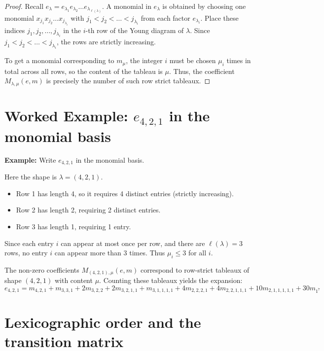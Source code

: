 \documentclass[12pt]{memoir}
\begin{document}
\begin{proof}
Recall $e_\lambda = e_{\lambda_1} e_{\lambda_2} \dots e_{\lambda_{\ell(\lambda)}}$. A monomial in $e_\lambda$ is obtained by choosing one monomial $x_{j_1} x_{j_2} \dots x_{j_{\lambda_i}}$ with $j_1 < j_2 < \dots < j_{\lambda_i}$ from each factor $e_{\lambda_i}$. Place these indices $j_1, j_2, \dots, j_{\lambda_i}$ in the $i$-th row of the Young diagram of $\lambda$. Since $j_1 < j_2 < \dots < j_{\lambda_i}$, the rows are strictly increasing.

To get a monomial corresponding to $m_\mu$, the integer $i$ must be chosen $\mu_i$ times in total across all rows, so the content of the tableau is $\mu$. Thus, the coefficient $M_{\lambda,\mu}(e,m)$ is precisely the number of such row strict tableaux.
\end{proof}

\newpage

\section{Worked Example: \texorpdfstring{$e_{4,2,1}$}{e\_\{4,2,1\}} in the monomial basis}

\textbf{Example:} Write $e_{4,2,1}$ in the monomial basis.

Here the shape is $\lambda = (4,2,1)$.
\begin{itemize}[label=$\diamond$]
    \item Row 1 has length 4, so it requires 4 distinct entries (strictly increasing).
    \item Row 2 has length 2, requiring 2 distinct entries.
    \item Row 3 has length 1, requiring 1 entry.
\end{itemize}

Since each entry $i$ can appear at most once per row, and there are $\ell(\lambda) = 3$ rows, no entry $i$ can appear more than $3$ times. Thus $\mu_i \le 3$ for all $i$.

The non-zero coefficients $M_{(4,2,1),\mu}(e,m)$ correspond to row-strict tableaux of shape $(4,2,1)$ with content $\mu$. Counting these tableaux yields the expansion:
\[
e_{4,2,1} = m_{4,2,1} + m_{3,3,1} + 2 m_{3,2,2} + 2 m_{3,2,1,1} + m_{3,1,1,1,1} + 4 m_{2,2,2,1} + 4 m_{2,2,1,1,1} + 10 m_{2,1,1,1,1,1} + 30 m_{1^7}
\]

\newpage

\section{Lexicographic order and the transition matrix}
\end{document}

